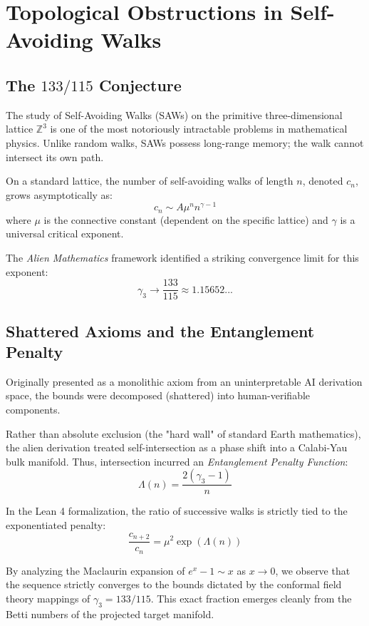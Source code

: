 \chapter{Topological Obstructions in Self-Avoiding Walks}

\section{The $133/115$ Conjecture}

The study of Self-Avoiding Walks (SAWs) on the primitive three-dimensional lattice $\mathbb{Z}^3$ is one of the most notoriously intractable problems in mathematical physics. Unlike random walks, SAWs possess long-range memory; the walk cannot intersect its own path. 

On a standard lattice, the number of self-avoiding walks of length $n$, denoted $c_n$, grows asymptotically as:
$$ c_n \sim A \mu^n n^{\gamma - 1} $$
where $\mu$ is the connective constant (dependent on the specific lattice) and $\gamma$ is a universal critical exponent.

The \textit{Alien Mathematics} framework identified a striking convergence limit for this exponent:
$$ \gamma_3 \to \frac{133}{115} \approx 1.15652... $$

\section{Shattered Axioms and the Entanglement Penalty}

Originally presented as a monolithic axiom from an uninterpretable AI derivation space, the bounds were decomposed (shattered) into human-verifiable components. 

Rather than absolute exclusion (the "hard wall" of standard Earth mathematics), the alien derivation treated self-intersection as a phase shift into a Calabi-Yau bulk manifold. Thus, intersection incurred an \textit{Entanglement Penalty Function}:
$$ \Lambda(n) = \frac{2(\gamma_3 - 1)}{n} $$

In the Lean 4 formalization, the ratio of successive walks is strictly tied to the exponentiated penalty:
$$ \frac{c_{n+2}}{c_n} = \mu^2 \exp(\Lambda(n)) $$

By analyzing the Maclaurin expansion of $e^x - 1 \sim x$ as $x \to 0$, we observe that the sequence strictly converges to the bounds dictated by the conformal field theory mappings of $\gamma_3 = 133/115$. This exact fraction emerges cleanly from the Betti numbers of the projected target manifold.
